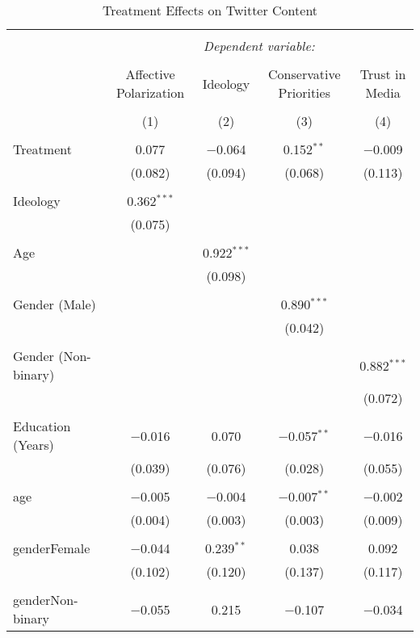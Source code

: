 
\begin{table}[!htbp] \centering 
  \caption{Treatment Effects on Twitter Content} 
  \label{} 
\begin{tabular}{@{\extracolsep{5pt}}lcccc} 
\\[-1.8ex]\hline 
\hline \\[-1.8ex] 
 & \multicolumn{4}{c}{\textit{Dependent variable:}} \\ 
\cline{2-5} 
\\[-1.8ex] & Affective Polarization & Ideology & Conservative Priorities & Trust in Media \\ 
\\[-1.8ex] & (1) & (2) & (3) & (4)\\ 
\hline \\[-1.8ex] 
 Treatment & 0.077 & $-$0.064 & 0.152$^{**}$ & $-$0.009 \\ 
  & (0.082) & (0.094) & (0.068) & (0.113) \\ 
  & & & & \\ 
 Ideology & 0.362$^{***}$ &  &  &  \\ 
  & (0.075) &  &  &  \\ 
  & & & & \\ 
 Age &  & 0.922$^{***}$ &  &  \\ 
  &  & (0.098) &  &  \\ 
  & & & & \\ 
 Gender (Male) &  &  & 0.890$^{***}$ &  \\ 
  &  &  & (0.042) &  \\ 
  & & & & \\ 
 Gender (Non-binary) &  &  &  & 0.882$^{***}$ \\ 
  &  &  &  & (0.072) \\ 
  & & & & \\ 
 Education (Years) & $-$0.016 & 0.070 & $-$0.057$^{**}$ & $-$0.016 \\ 
  & (0.039) & (0.076) & (0.028) & (0.055) \\ 
  & & & & \\ 
 age & $-$0.005 & $-$0.004 & $-$0.007$^{**}$ & $-$0.002 \\ 
  & (0.004) & (0.003) & (0.003) & (0.009) \\ 
  & & & & \\ 
 genderFemale & $-$0.044 & 0.239$^{**}$ & 0.038 & 0.092 \\ 
  & (0.102) & (0.120) & (0.137) & (0.117) \\ 
  & & & & \\ 
 genderNon-binary & $-$0.055 & 0.215 & $-$0.107 & $-$0.034 \\ 

\end{tabular}
\end{table}
